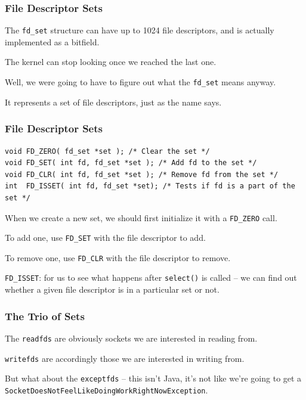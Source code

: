 \begin{frame}
\frametitle{File Descriptor Sets}

The \texttt{fd\_set} structure can have up to 1024 file descriptors, and is actually implemented as a bitfield.

The kernel can stop looking once we reached the last one.

Well, we were going to have to figure out what the \texttt{fd\_set} means anyway. 

It represents a set of file descriptors, just as the name says. 

\end{frame}

\begin{frame}[fragile]
\frametitle{File Descriptor Sets}

\begin{lstlisting}
void FD_ZERO( fd_set *set ); /* Clear the set */
void FD_SET( int fd, fd_set *set ); /* Add fd to the set */
void FD_CLR( int fd, fd_set *set ); /* Remove fd from the set */
int  FD_ISSET( int fd, fd_set *set); /* Tests if fd is a part of the set */ 
\end{lstlisting}

When we create a new set, we should first initialize it with a \texttt{FD\_ZERO} call.

To add one, use \texttt{FD\_SET} with the file descriptor to add. 

To remove one, use \texttt{FD\_CLR} with the file descriptor to remove. 

\texttt{FD\_ISSET}: for us to see what happens after \texttt{select()} is called -- we can find out whether a given file descriptor is in a particular set or not.

\end{frame}

\begin{frame}
\frametitle{The Trio of Sets}

The \texttt{readfds} are obviously sockets we are interested in reading from.

\texttt{writefds} are accordingly those we are interested in writing from. 

But what about the \texttt{exceptfds} -- this isn't Java, it's not like we're going to get a \texttt{SocketDoesNotFeelLikeDoingWorkRightNowException}.


\end{frame}

